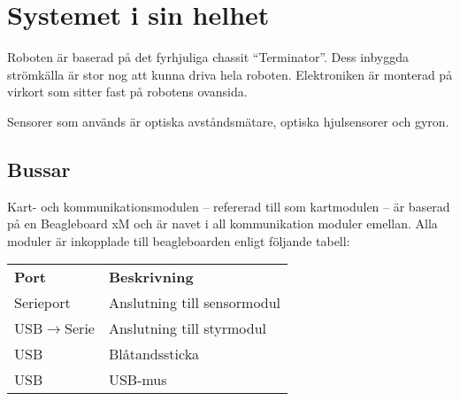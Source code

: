 \section{Systemet i sin helhet}

Roboten är baserad på det fyrhjuliga chassit ``Terminator''. Dess inbyggda
strömkälla är stor nog att kunna driva hela roboten. Elektroniken är monterad
på virkort som sitter fast på robotens ovansida.

Sensorer som används är optiska avståndsmätare, optiska hjulsensorer och gyron.

\subsection{Bussar}

Kart- och kommunikationsmodulen -- refererad till som kartmodulen -- är baserad
på en Beagleboard xM och är navet i all kommunikation moduler emellan. Alla
moduler är inkopplade till beagleboarden enligt följande tabell:

\begin{table}[h!]
	\begin{tabular}{l l}
		\textbf{Port} & \textbf{Beskrivning} \\
		Serieport     & Anslutning till sensormodul \\
		USB$\rightarrow$Serie    & Anslutning till styrmodul \\
		USB           & Blåtandssticka \\
		USB           & USB-mus \\
	\end{tabular}
\end{table}
